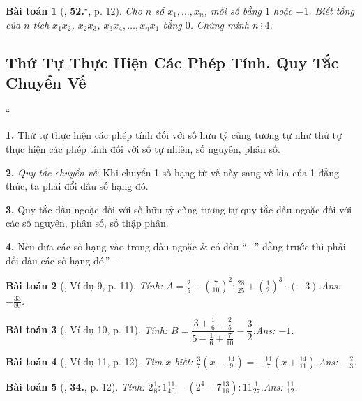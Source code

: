 \documentclass{article}
\numberwithin{equation}{section}
\newtheorem{baitoan}{Bài toán}
\begin{document}
\begin{baitoan}[\cite{Binh_Toan_7_tap_1}, \textbf{52.}${}^\star$, p. 12]
	Cho $n$ số $x_1,\ldots,x_n$, mỗi số bằng $1$ hoặc $-1$. Biết tổng của $n$ tích $x_1x_2$, $x_2x_3$, $x_3x_4,\ldots,x_nx_1$ bằng $0$. Chứng minh $n\ \vdots\ 4$.
\end{baitoan}


\subsection{Thứ Tự Thực Hiện Các Phép Tính. Quy Tắc Chuyển Vế}
``\begin{enumerate*}
	\item[\textbf{1.}] Thứ tự thực hiện các phép tính đối với số hữu tỷ cũng tương tự như thứ tự thực hiện các phép tính đối với số tự nhiên, số nguyên, phân số.
	\item[\textbf{2.}] \textit{Quy tắc chuyển vế}: Khi chuyển 1 số hạng từ vế này sang vế kia của 1 đẳng thức, ta phải đổi dấu số hạng đó.
	\item[\textbf{3.}] Quy tắc dấu ngoặc đối với số hữu tỷ cũng tương tự quy tắc dấu ngoặc đối với các số nguyên, phân số, số thập phân.
	\item[\textbf{4.}] Nếu đưa các số hạng vào trong dấu ngoặc \& có dấu ``$-$'' đằng trước thì phải đổi dấu các số hạng đó.'' -- \cite[\S4, p. 11]{Tuyen_Toan_7} 
\end{enumerate*}

\begin{baitoan}[\cite{Tuyen_Toan_7}, Ví dụ 9, p. 11]
	Tính: $A = \frac{2}{5} - \left(\frac{7}{10}\right)^2:\frac{28}{25} + \left(\frac{1}{2}\right)^3\cdot(-3)$.\hfill\textsf{Ans:} $-\frac{33}{80}$.
\end{baitoan}

\begin{baitoan}[\cite{Tuyen_Toan_7}, Ví dụ 10, p. 11]
	Tính: $B = \dfrac{3 + \frac{1}{6} - \frac{2}{5}}{5 - \frac{1}{6} + \frac{7}{10}} - \dfrac{3}{2}$.\hfill\textsf{Ans:} $-1$.
\end{baitoan}

\begin{baitoan}[\cite{Tuyen_Toan_7}, Ví dụ 11, p. 12]
	Tìm $x$ biết: $\frac{3}{7}\left(x - \frac{14}{9}\right) = -\frac{11}{7}\left(x + \frac{14}{11}\right)$.\hfill\textsf{Ans:} $-\frac{2}{3}$.
\end{baitoan}

\begin{baitoan}[\cite{Tuyen_Toan_7}, \textbf{34.}, p. 12]
	Tính: $2\frac{1}{8}:1\frac{11}{40} - \left(2^4 - 7\frac{13}{18}\right):11\frac{1}{27}$.\hfill\textsf{Ans:} $\frac{11}{12}$.
\end{baitoan}
\end{document}
